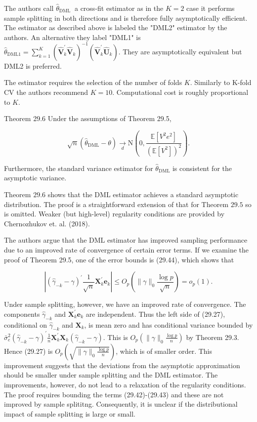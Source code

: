 \documentclass[10pt]{article}
\begin{document}
The authors call $\widehat{\theta}_{\text {DML }}$ a cross-fit estimator as in the $K=2$ case it performs sample splitting in both directions and is therefore fully asymptotically efficient. The estimator as described above is labeled the "DML2" estimator by the authors. An alternative they label "DML1" is $\widehat{\theta}_{\mathrm{DML} 1}=\sum_{k=1}^{K}\left(\widehat{\boldsymbol{V}}_{k}^{\prime} \widehat{\boldsymbol{V}}_{k}\right)^{-1}\left(\widehat{\boldsymbol{V}}_{k}^{\prime} \widehat{\boldsymbol{U}}_{k}\right)$. They are asymptotically equivalent but DML2 is preferred.

The estimator requires the selection of the number of folds $K$. Similarly to K-fold CV the authors recommend $K=10$. Computational cost is roughly proportional to $K$.

Theorem 29.6 Under the assumptions of Theorem 29.5,

$$
\sqrt{n}\left(\widehat{\theta}_{\mathrm{DML}}-\theta\right) \underset{d}{\longrightarrow} \mathrm{N}\left(0, \frac{\mathbb{E}\left[V^{2} e^{2}\right]}{\left(\mathbb{E}\left[V^{2}\right]\right)^{2}}\right) .
$$

Furthermore, the standard variance estimator for $\widehat{\theta}_{\mathrm{DML}}$ is consistent for the asymptotic variance.

Theorem $29.6$ shows that the DML estimator achieves a standard asymptotic distribution. The proof is a straightforward extension of that for Theorem $29.5$ so is omitted. Weaker (but high-level) regularity conditions are provided by Chernozhukov et. al. (2018).

The authors argue that the DML estimator has improved sampling performance due to an improved rate of convergence of certain error terms. If we examine the proof of Theorem 29.5, one of the error bounds is (29.44), which shows that

$$
\left|\left(\widehat{\gamma}_{-k}-\gamma\right)^{\prime} \frac{1}{\sqrt{n}} \boldsymbol{X}_{k}^{\prime} \boldsymbol{e}_{k}\right| \leq O_{p}\left(\|\gamma\|_{0} \frac{\log p}{\sqrt{n}}\right)=o_{p}(1) .
$$

Under sample splitting, however, we have an improved rate of convergence. The components $\widehat{\gamma}_{-k}$ and $\boldsymbol{X}_{k}^{\prime} \boldsymbol{e}_{k}$ are independent. Thus the left side of (29.27), conditional on $\widehat{\gamma}_{-k}$ and $\boldsymbol{X}_{k}$, is mean zero and has conditional variance bounded by $\bar{\sigma}_{e}^{2}\left(\widehat{\gamma}_{-k}-\gamma\right)^{\prime} \frac{1}{n} \boldsymbol{X}_{k}^{\prime} \boldsymbol{X}_{k}\left(\widehat{\gamma}_{-k}-\gamma\right)$. This is $O_{p}\left(\|\gamma\|_{0} \frac{\log p}{n}\right)$ by Theorem 29.3. Hence (29.27) is $O_{p}\left(\sqrt{\|\gamma\|_{0} \frac{\log p}{n}}\right)$, which is of smaller order. This improvement suggests that the deviations from the asymptotic approximation should be smaller under sample splitting and the DML estimator. The improvements, however, do not lead to a relaxation of the regularity conditions. The proof requires bounding the terms (29.42)-(29.43) and these are not improved by sample splititng. Consequently, it is unclear if the distributional impact of sample splitting is large or small.
\end{document}
